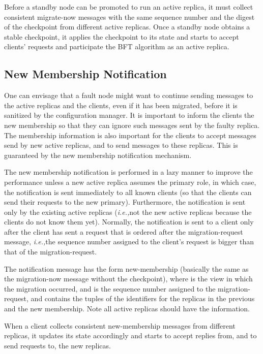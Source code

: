 \documentclass[times, 10pt, twocolumn]{article}
\newcommand{\ie}{{\it i.e.,}}
\begin{document}
Before a standby node can be promoted to run an active replica,
it must collect  consistent {\sc migrate-now} messages with the
same sequence number and the digest of the checkpoint from different active 
replicas. Once a standby node obtains a stable checkpoint, it applies the
checkpoint to its state and starts to accept clients' requests and
participate the BFT algorithm as an active replica.

\subsection{New Membership Notification}
One can envisage that a fault node might want to continue sending
messages to the active replicas and the clients, even if it has been
migrated, before it is sanitized by the configuration manager. It is
important to inform the clients the new membership so that they
can ignore such messages sent by the faulty replica. The membership
information is also important for the clients to accept messages
send by new active replicas, and to send messages to these replicas. 
This is guaranteed by the new membership notification mechanism.

The new membership notification is performed in a lazy manner to
improve the performance unless a new active replica assumes the primary
role, in which case, the notification is sent immediately to all known
clients (so that the clients can send their requests to the new primary). 
Furthermore, the notification is sent only by the existing active 
replicas (\ie not the new active replicas because the clients do not know 
them yet).
Normally, the notification is sent to a client only after the client has
sent a request that is ordered after the {\sc migration-request} message,
\ie the sequence number assigned to the client's request is bigger than
that of the {\sc migration-request}.

The notification message has the form 
{\sc new-membership} (basically the same
as the {\sc migration-now} message without the checkpoint), where
 is the view in which the migration occurred, and  is the
sequence number assigned to the {\sc migration-request}, and 
contains the tuples of the identifiers for the replicas in the previous and 
the new membership. Note all active replicas should have the information.

When a client collects  consistent {\sc new-membership} messages
from different replicas, it updates its state accordingly and starts
to accept replies from, and to send requests to, the new replicas.
\end{document}
